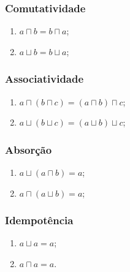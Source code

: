 \hypertarget{comutatividade}{%
\subsubsection{Comutatividade}\label{comutatividade}}

\begin{enumerate}
\def\labelenumi{\arabic{enumi}.}
\tightlist
\item
  \(a \sqcap b = b \sqcap a\);
\item
  \(a \sqcup b = b \sqcup a\);
\end{enumerate}

\hypertarget{associatividade}{%
\subsubsection{Associatividade}\label{associatividade}}

\begin{enumerate}
\def\labelenumi{\arabic{enumi}.}
\setcounter{enumi}{2}
\tightlist
\item
  \(a \sqcap (b \sqcap c) = (a \sqcap b) \sqcap c\);
\item
  \(a \sqcup (b \sqcup c) = (a \sqcup b) \sqcup c\);
\end{enumerate}

\hypertarget{absoruxe7uxe3o}{%
\subsubsection{Absorção}\label{absoruxe7uxe3o}}

\begin{enumerate}
\def\labelenumi{\arabic{enumi}.}
\setcounter{enumi}{4}
\tightlist
\item
  \(a \sqcup (a \sqcap b) = a\);
\item
  \(a \sqcap (a \sqcup b) = a\);
\end{enumerate}

\hypertarget{idempotuxeancia}{%
\subsubsection{Idempotência}\label{idempotuxeancia}}

\begin{enumerate}
\def\labelenumi{\arabic{enumi}.}
\setcounter{enumi}{6}
\tightlist
\item
  \(a \sqcup a = a\);
\item
  \(a \sqcap a = a\).
\end{enumerate}

